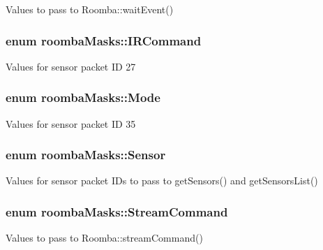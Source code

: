 Values to pass to Roomba::waitEvent() \hypertarget{namespaceroomba_masks_a42c0f4dda7d15b88115f15513422547f}{
\subsubsection[{IRCommand}]{\setlength{\rightskip}{0pt plus 5cm}enum {\bf roombaMasks::IRCommand}}}
\label{namespaceroomba_masks_a42c0f4dda7d15b88115f15513422547f}
Values for sensor packet ID 27 \hypertarget{namespaceroomba_masks_a649d73395e98d80b35b5fbfeb2c276c2}{
\subsubsection[{Mode}]{\setlength{\rightskip}{0pt plus 5cm}enum {\bf roombaMasks::Mode}}}
\label{namespaceroomba_masks_a649d73395e98d80b35b5fbfeb2c276c2}
Values for sensor packet ID 35 \hypertarget{namespaceroomba_masks_af50727ed54927015c0a31955a3fb2c4c}{
\subsubsection[{Sensor}]{\setlength{\rightskip}{0pt plus 5cm}enum {\bf roombaMasks::Sensor}}}
\label{namespaceroomba_masks_af50727ed54927015c0a31955a3fb2c4c}
Values for sensor packet IDs to pass to getSensors() and getSensorsList() \hypertarget{namespaceroomba_masks_aca4085268dd02bb55133f0ec380bf70d}{
\subsubsection[{StreamCommand}]{\setlength{\rightskip}{0pt plus 5cm}enum {\bf roombaMasks::StreamCommand}}}
\label{namespaceroomba_masks_aca4085268dd02bb55133f0ec380bf70d}
Values to pass to Roomba::streamCommand() 
